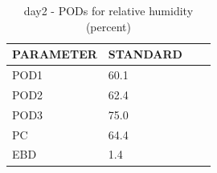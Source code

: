 \begin{table}[p!]
\begin{center}
\begin{tabular}{|l|l|l|l|}
\hline
\multicolumn{1}{|c|}{\cellcolor[HTML]{C0C0C0}\textbf{PARAMETER}} & \multicolumn{1}{c|}{\cellcolor[HTML]{C0C0C0}\textbf{STANDARD}} \\
\hline
\cellcolor[HTML]{C0C0C0}POD1  & 60.1                                \\
\cellcolor[HTML]{C0C0C0}POD2  & 62.4                                \\
\cellcolor[HTML]{C0C0C0}POD3  & 75.0                                \\
\cellcolor[HTML]{C0C0C0}PC    & 64.4                                  \\
\cellcolor[HTML]{C0C0C0}EBD   & 1.4                                 \\
\hline
\end{tabular}
\caption{day2 - PODs for relative humidity (percent)}
\label{tab:podrh:day2}
\end{center}
\end{table}

